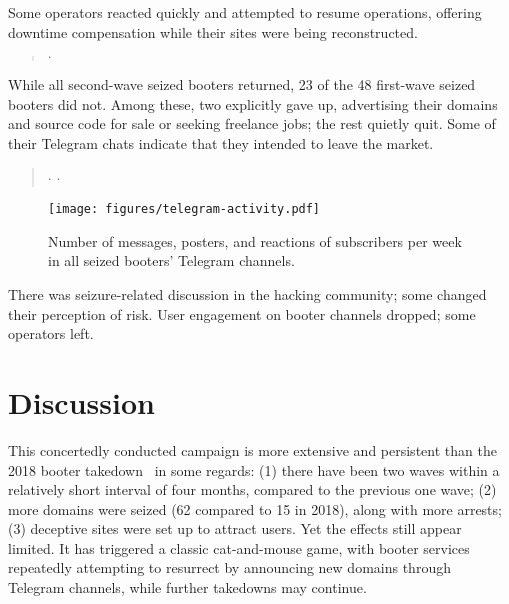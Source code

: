 \documentclass[letterpaper,twocolumn,10pt]{article}
\begin{document}
 Some operators reacted quickly and attempted to resume operations, offering downtime compensation while their sites were being reconstructed.
\begingroup
\addtolength\leftmargini{-0.15in}
\begin{quote}
    \small
     $\cdot$ 
\end{quote}
\endgroup

\noindent While all second-wave seized booters returned, 23 of the 48 first-wave seized booters did not. Among these, two explicitly gave up, advertising their domains and source code for sale or seeking freelance jobs; the rest quietly quit. Some of their Telegram chats indicate that they intended to leave the market.
\begingroup \addtolength\leftmargini{-0.15in}
\begin{quote} 
    \small
     $\cdot$
     $\cdot$
\end{quote}
\endgroup

\begin{figure}[t]
    \centering
    \texttt{[image: figures/telegram-activity.pdf]}\\
    \caption{Number of messages, posters, and reactions of subscribers per week in all seized booters' Telegram channels.}
    \label{fig:telegram-activity}
\end{figure}
 There was seizure-related discussion in the hacking community; some changed their perception of risk. User engagement on booter channels dropped; some operators left.

\section{Discussion} \label{sec:discussion}
This concertedly conducted campaign is more extensive and persistent than the 2018 booter takedown~\cite{collier2019booting,kopp2019ddos} in some regards: (1) there have been two waves within a relatively short interval of four months, compared to the previous one wave; (2) more domains were seized (62 compared to 15 in 2018), along with more arrests; (3) deceptive sites were set up to attract users. Yet the effects still appear limited. It has triggered a classic cat-and-mouse game, with booter services repeatedly attempting to resurrect by announcing new domains through Telegram channels, while further takedowns may continue.
\end{document}
